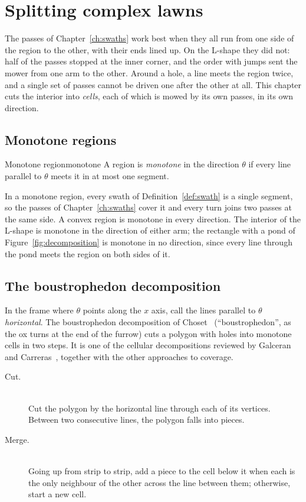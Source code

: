 \chapter{Splitting complex lawns}
\label{ch:split}

The passes of Chapter~\ref{ch:swaths} work best when they all run from one
side of the region to the other, with their ends lined up. On the L-shape
they did not: half of the passes stopped at the inner corner, and the order
with jumps sent the mower from one arm to the other. Around a hole, a line
meets the region twice, and a single set of passes cannot be driven one
after the other at all. This chapter cuts the interior into \emph{cells},
each of which is mowed by its own passes, in its own direction.

\section{Monotone regions}

\begin{definition}{Monotone region}{monotone}
  A region is \emph{monotone} in the direction $\theta$ if every line
  parallel to $\theta$ meets it in at most one segment.
\end{definition}

In a monotone region, every swath of Definition~\ref{def:swath} is a single
segment, so the passes of Chapter~\ref{ch:swaths} cover it and every turn
joins two passes at the same side. A convex region is monotone in every
direction. The interior of the L-shape is monotone in the direction of
either arm; the rectangle with a pond of Figure~\ref{fig:decomposition} is
monotone in no direction, since every line through the pond meets the
region on both sides of it.

\section{The boustrophedon decomposition}

In the frame where $\theta$ points along the $x$ axis, call the lines
parallel to $\theta$ \emph{horizontal}. The boustrophedon decomposition of
Choset~\cite{choset2000coverage} (``boustrophedon'', as the ox turns at the
end of the furrow) cuts a polygon with holes into monotone cells in two
steps. It is one of the cellular decompositions reviewed by Galceran and
Carreras~\cite{galceran2013survey}, together with the other approaches to
coverage.

\begin{description}
  \item[Cut.]
    \leavevmode\\
    Cut the polygon by the horizontal line through each of its vertices.
    Between two consecutive lines, the polygon falls into pieces.
  \item[Merge.]
    \leavevmode\\
    Going up from strip to strip, add a piece to the cell below it when
    each is the only neighbour of the other across the line between them;
    otherwise, start a new cell.
\end{description}

